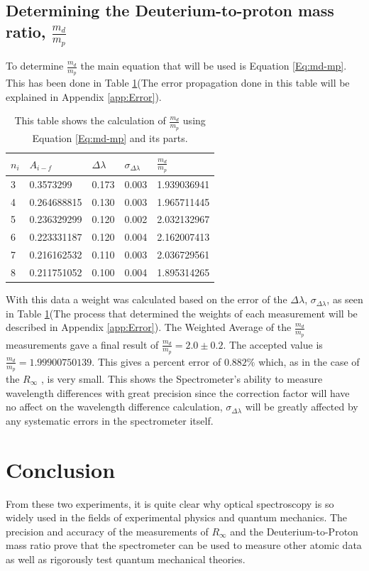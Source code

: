 \documentclass[%
 aps,%
 pra,%
 preprint, %
 amsmath, %
 amsfonts, %
 amssymb, %
]{revtex4-2}
\newcommand{\D}{Deuterium}
\newcommand{\Rin}{$R_\infty$ }
\begin{document}
\subsection{Determining the \D-to-proton mass ratio, $\frac{m_d}{m_p}$}
To determine $\frac{m_d}{m_p}$ the main equation that will be used is Equation \ref{Eq:md-mp}. This has been done in Table \ref{tab:md-mp}(The error propagation done in this table will be explained in Appendix \ref{app:Error}).

\begin{table}[]
\begin{tabular}{l|l|l|l|l}
\hline
\hline
$n_i$ & $A_{i-f}$   & $\Delta \lambda$ & $\sigma_{\Delta \lambda}$ & $\frac{m_d}{m_p}$ \\ \hline
3  & 0.3573299   & 0.173      & 0.003              & 1.939036941       \\
4  & 0.264688815 & 0.130       & 0.003              & 1.965711445       \\
5  & 0.236329299 & 0.120      & 0.002               & 2.032132967       \\
6  & 0.223331187 & 0.120       & 0.004              & 2.162007413       \\
7  & 0.216162532 & 0.110       & 0.003              & 2.036729561       \\
8  & 0.211751052 & 0.100        & 0.004              & 1.895314265       \\ \hline
\hline
\end{tabular}
\caption{This table shows the calculation of $\frac{m_d}{m_p}$ using Equation \ref{Eq:md-mp} and its parts.}
\label{tab:md-mp}
\end{table}
With this data a weight was calculated based on the error of the $\Delta \lambda$, $\sigma_{\Delta \lambda}$, as seen in Table \ref{tab:md-mp}(The process that determined the weights of each measurement will be described in Appendix \ref{app:Error}). The Weighted Average of the $\frac{m_d}{m_p}$ measurements gave a final result of $\frac{m_d}{m_p}=2.0 \pm 0.2$. The accepted value is $\frac{m_d}{m_p}=1.99900750139$\cite{CODATA2020}. This gives a percent error of $0.882\%$ which, as in the case of the \Rin, is very small. This shows the Spectrometer's ability to measure wavelength differences with great precision since the correction factor will have no affect on the wavelength difference calculation, $\sigma_{\Delta \lambda}$ will be greatly affected by any systematic errors in the spectrometer itself. 

\section{Conclusion}
From these two experiments, it is quite clear why optical spectroscopy is so widely used in the fields of experimental physics and quantum mechanics. The precision and accuracy of the measurements of \Rin and the \D-to-Proton mass ratio prove that the spectrometer can be used to measure other atomic data as well as rigorously test quantum mechanical theories.
\end{document}
